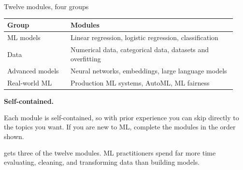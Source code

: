 

\begin{frame}{Twelve modules, four groups}
  \begin{withmargin}
    \begin{tdmain}
      \footnotesize
      \begin{tabular}{@{}p{0.26\linewidth}p{0.68\linewidth}@{}}
        \toprule
        \textbf{Group} & \textbf{Modules}\\
        \midrule
        ML models & Linear regression, logistic regression, classification\\[0.3em]
        Data & Numerical data, categorical data, datasets and overfitting\\[0.3em]
        Advanced models & Neural networks, embeddings, large language models\\[0.3em]
        Real-world ML & Production ML systems, AutoML, ML fairness\\
        \bottomrule
      \end{tabular}
    \end{tdmain}
    \begin{tdmargin}
      {\color{tdfg}\textbf{Self-contained.}}
      \par\medskip
      Each module is self-contained, so with prior experience you can skip
      directly to the topics you want. If you are new to ML, complete the
      modules in the order shown.
      \par\medskip
       gets three of the twelve modules. ML practitioners spend far
      more time evaluating, cleaning, and transforming data than building
      models.
    \end{tdmargin}
  \end{withmargin}
\end{frame}

